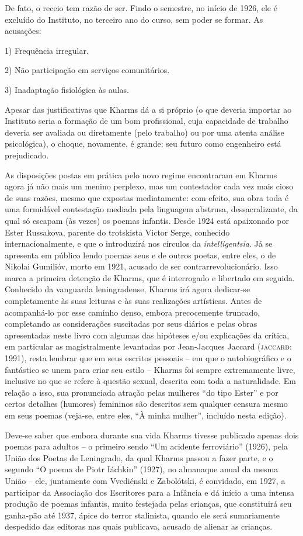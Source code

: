 De fato, o receio tem razão de ser. Findo o semestre, no início de 1926,
ele é excluído do Instituto, no terceiro ano do curso, sem poder se
formar. As acusações:

1) Frequência irregular.

2) Não participação em serviços comunitários.

3) Inadaptação fisiológica às aulas.

Apesar das justificativas que Kharms dá a si próprio (o que deveria
importar ao Instituto seria a formação de um bom profissional, cuja
capacidade de trabalho deveria ser avaliada ou diretamente (pelo
trabalho) ou por uma atenta análise psicológica), o choque, novamente, é
grande: seu futuro como engenheiro está prejudicado.

As disposições postas em prática pelo novo regime encontraram em Kharms
agora já não mais um menino perplexo, mas um contestador cada vez mais
cioso de suas razões, mesmo que expostas mediatamente: com efeito, sua
obra toda é uma formidável contestação mediada pela linguagem abstrusa,
dessacralizante, da qual só escapam (às vezes) os poemas infantis. Desde
1924 está apaixonado por Ester Russakova, parente do trotskista Victor
Serge, conhecido internacionalmente, e que o introduzirá nos círculos da
\emph{intelligentsia}. Já se apresenta em público lendo poemas seus e de
outros poetas, entre eles, o de Nikolai Gumilióv, morto em 1921, acusado
de ser contrarrevolucionário. Isso marca a primeira detenção de Kharms,
que é interrogado e libertado em seguida. Conhecido da vanguarda
leningradense, Kharms irá agora dedicar-se completamente às suas
leituras e às suas realizações artísticas. Antes de acompanhá-lo por
esse caminho denso, embora precocemente truncado, completando as
considerações suscitadas por seus diários e pelas obras apresentadas
neste livro com algumas das hipóteses e/ou explicações da crítica, em
particular as magistralmente levantadas por Jean-Jacques Jaccard
(\textsc{jaccard}: 1991), resta lembrar que em seus escritos pessoais --
em que o autobiográfico e o fantástico se unem para criar seu estilo --
Kharms foi sempre extremamente livre, inclusive no que se refere à
questão sexual, descrita com toda a naturalidade. Em relação a isso, sua
pronunciada atração pelas mulheres ``do tipo Ester'' e por certos
detalhes (humores) femininos são descritos sem qualquer censura mesmo em
seus poemas (veja-se, entre eles, ``À minha mulher'', incluído nesta
edição).

Deve-se saber que embora durante sua vida Kharms tivesse publicado
apenas dois poemas para adultos -- o primeiro sendo ``Um acidente
ferroviário'' (1926), pela União dos Poetas de Leningrado, da qual
Kharms passou a fazer parte, e o segundo ``O poema de Piotr Iáchkin''
(1927), no almanaque anual da mesma União -- ele, juntamente com
Vvediénski e Zabolótski, é convidado, em 1927, a participar da
Associação dos Escritores para a Infância e dá início a uma intensa
produção de poemas infantis, muito festejada pelas crianças, que
constituirá seu ganha-pão até 1937, ápice do terror stalinista, quando
ele será sumariamente despedido das editoras nas quais publicava,
acusado de alienar as crianças.

